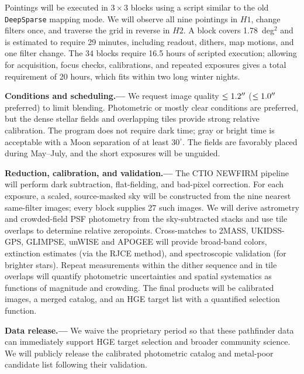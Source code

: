 \documentclass[11pt]{article}
\begin{document}
Pointings will be executed in $3\times3$ blocks using a script similar to the old \texttt{DeepSparse} mapping mode. We will observe all nine pointings in $H1$, change filters once,
and traverse the grid in reverse in $H2$. A block covers 1.78~deg$^2$ and is
estimated to require 29 minutes, including readout, dithers, map motions, and
one filter change. The 34 blocks require 16.5 hours of scripted execution;
allowing for acquisition, focus checks, calibrations, and repeated exposures
gives a total requirement of 20 hours, which fits within two long winter
nights.

\smallskip
\noindent\textbf{Conditions and scheduling.---}
We request image quality $\leq1.2\hbox{$^{\prime\prime}$}$ ($\leq1.0\hbox{$^{\prime\prime}$}$ preferred) to
limit blending. Photometric or mostly clear conditions are preferred, but the
dense stellar fields and overlapping tiles provide strong relative
calibration. The program does not require dark time; gray or bright time is
acceptable with a Moon separation of at least $30^\circ$. The fields are
favorably placed during May--July, and the short exposures will be unguided.

\smallskip
\noindent\textbf{Reduction, calibration, and validation.---}
The CTIO NEWFIRM pipeline will perform dark subtraction, flat-fielding, and
bad-pixel correction. For each exposure, a scaled, source-masked sky will be
constructed from the nine nearest same-filter images; every block supplies 27
such images. We will derive astrometry and crowded-field PSF photometry from
the sky-subtracted stacks and use tile overlaps to determine relative
zeropoints. Cross-matches to 2MASS, UKIDSS-GPS, GLIMPSE, unWISE and APOGEE will
provide broad-band colors, extinction estimates (via the RJCE method), and spectroscopic validation (for brighter stars).
Repeat measurements within the dither sequence and in tile overlaps will quantify photometric uncertainties and spatial systematics as functions of magnitude and crowding.
The final products will be calibrated images, a merged catalog, and an HGE target
list with a quantified selection function.

\noindent\textbf{Data release.---} We waive the proprietary period so that these pathfinder data can immediately support HGE target selection and broader community science. We will publicly release the calibrated photometric catalog and metal-poor candidate list following their validation.
\end{document}

